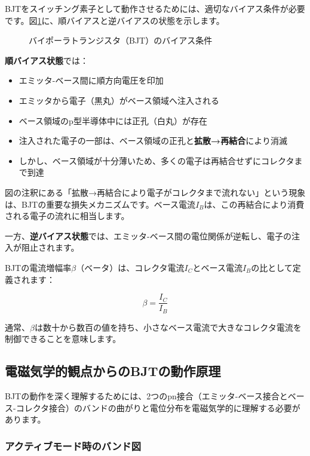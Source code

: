 BJTをスイッチング素子として動作させるためには、適切なバイアス条件が必要です。図\ref{fig:bjt_bias}に、順バイアスと逆バイアスの状態を示します。

\begin{figure}[H]
\centering
{}
\caption{バイポーラトランジスタ（BJT）のバイアス条件}
\label{fig:bjt_bias}
\end{figure}

\textbf{順バイアス状態}では：

\begin{itemize}
\item エミッタ-ベース間に順方向電圧を印加
\item エミッタから電子（黒丸）がベース領域へ注入される
\item ベース領域のp型半導体中には正孔（白丸）が存在
\item 注入された電子の一部は、ベース領域の正孔と\textbf{拡散→再結合}により消滅
\item しかし、ベース領域が十分薄いため、多くの電子は再結合せずにコレクタまで到達
\end{itemize}

図の注釈にある「拡散→再結合により電子がコレクタまで流れない」という現象は、BJTの重要な損失メカニズムです。ベース電流$I_B$は、この再結合により消費される電子の流れに相当します。

一方、\textbf{逆バイアス状態}では、エミッタ-ベース間の電位関係が逆転し、電子の注入が阻止されます。

BJTの電流増幅率$\beta$（ベータ）は、コレクタ電流$I_C$とベース電流$I_B$の比として定義されます：

\begin{equation}
\beta = \frac{I_C}{I_B}
\end{equation}

通常、$\beta$は数十から数百の値を持ち、小さなベース電流で大きなコレクタ電流を制御できることを意味します。

\subsection{電磁気学的観点からのBJTの動作原理}

BJTの動作を深く理解するためには、2つのpn接合（エミッタ-ベース接合とベース-コレクタ接合）のバンドの曲がりと電位分布を電磁気学的に理解する必要があります。

\subsubsection{アクティブモード時のバンド図}

